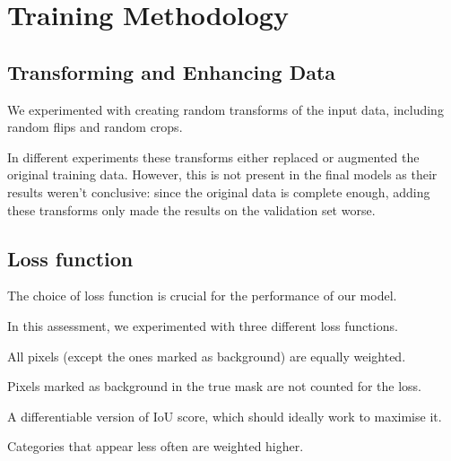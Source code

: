 \newcommand{\lt}{L\textsubscript{2}}

\section{Training Methodology}

\subsection{Transforming and Enhancing Data}



We experimented with creating random transforms of the input data, including random flips and random crops.

In different experiments these transforms either replaced or augmented the original training data.
However, this is not present in the final models as their results weren't conclusive: since the original data is complete enough, adding these transforms only made the results on the validation set worse.

\subsection{Loss function}

The choice of loss function is crucial for the performance of our model.

In this assessment, we experimented with three different loss functions.

\begin{description}[style=nextline]
	\item[Categorical Cross-Entropy Loss] All pixels (except the ones marked as background) are equally weighted.
	\item[CCE loss ignoring background pixels] Pixels marked as background in the true mask are not counted for the loss.
	\item[Intersection over Union Loss] A differentiable version of IoU score, which should ideally work to maximise it.
	\item[Dice Loss] Categories that appear less often are weighted higher\cite{dice_loss}.
\end{description}

